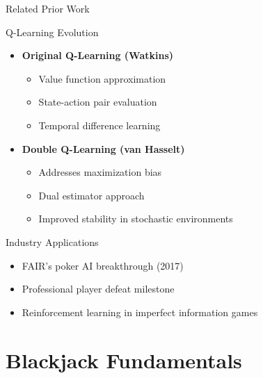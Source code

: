 \documentclass{beamer}
\begin{document}
\begin{frame}{Related Prior Work}
    \begin{block}{Q-Learning Evolution}
        \begin{itemize}
            \item \textbf{Original Q-Learning (Watkins)}
                \begin{itemize}
                    \item Value function approximation
                    \item State-action pair evaluation
                    \item Temporal difference learning
                \end{itemize}
            \item \textbf{Double Q-Learning (van Hasselt)}
                \begin{itemize}
                    \item Addresses maximization bias
                    \item Dual estimator approach
                    \item Improved stability in stochastic environments
                \end{itemize}
        \end{itemize}
    \end{block}
    
    \begin{block}{Industry Applications}
        \begin{itemize}
            \item FAIR's poker AI breakthrough (2017)
            \item Professional player defeat milestone
            \item Reinforcement learning in imperfect information games
        \end{itemize}
    \end{block}
\end{frame}

\section{Blackjack Fundamentals}
\end{document}
